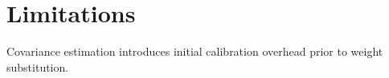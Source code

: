 \section{Limitations}Covariance estimation introduces initial calibration overhead prior to weight substitution.
